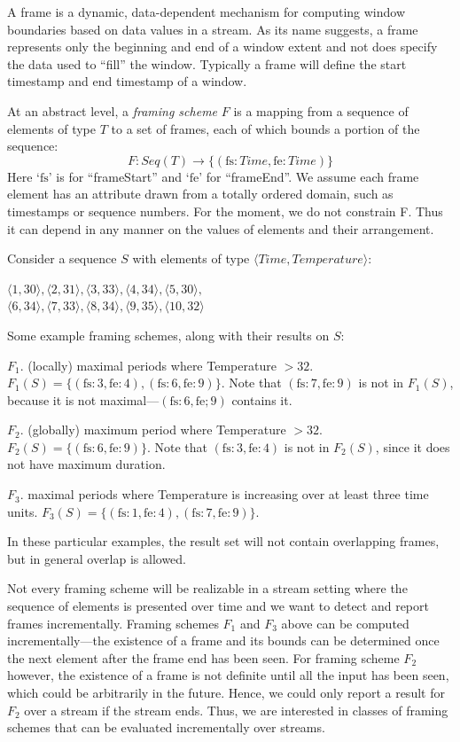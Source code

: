 \documentclass{vldb}
\newcommand{\dquote}[1]{``#1''}
\newcommand{\squote}[1]{`#1'}
\begin{document}
\begin{appendix}
A frame is a dynamic, data-dependent mechanism for computing window boundaries based on data values in a stream. As its name suggests, a frame represents only the beginning and end of a window extent and not does specify the data used to \dquote{fill} the window. Typically a frame will define the start timestamp and end timestamp of a window.

At an abstract level, a \emph{framing scheme} $F$ is a mapping from a sequence of elements of type $T$ to a set of frames, each of which bounds a portion of the sequence: $$F: Seq(T) \rightarrow \{(\text{fs}: Time, \text{fe}: Time)\}$$ Here \squote{$\text{fs}$} is for \dquote{frameStart} and \squote{$\text{fe}$} for \dquote{frameEnd}. We assume each frame element has an attribute drawn from a totally ordered domain, such as timestamps or sequence numbers. For the moment, we do not constrain F. Thus it can depend in any manner on the values of elements and their arrangement.

Consider a sequence $S$ with elements of type $\langle Time, Temperature \rangle$: 
\begin{center}
$\langle 1, 30 \rangle, \langle 2, 31 \rangle, \langle 3, 33 \rangle, \langle 4,34 \rangle, \langle 5, 30 \rangle,$ \\ 
$ \langle 6, 34 \rangle, \langle 7, 33 \rangle, \langle 8, 34 \rangle, \langle 9, 35 \rangle, \langle 10, 32 \rangle$
\end{center}
Some example framing schemes, along with their results on $S$:

$F_1$. (locally) maximal periods where Temperature $> 32$.  $F_1(S) = \{(\text{fs}: 3, \text{fe}: 4), (\text{fs}: 6, \text{fe}: 9)\}$. Note that $(\text{fs}: 7, \text{fe}: 9)$ is not in $F_1(S)$, because it is not maximal---$(\text{fs}: 6, \text{fe}; 9)$ contains it.

$F_2$. (globally) maximum period where Temperature $> 32$. $F_2(S) = \{(\text{fs}: 6, \text{fe}: 9)\}$. Note that $(\text{fs}: 3, \text{fe}: 4)$ is not in $F_2(S)$, since it does not have maximum duration.

$F_3$. maximal periods where Temperature is increasing over at least three time units. $F_3(S) = \{(\text{fs}: 1, \text{fe}: 4), (\text{fs}: 7, \text{fe}: 9)\}$.

In these particular examples, the result set will not contain overlapping frames, but in general overlap is allowed.

Not every framing scheme will be realizable in a stream setting where the sequence of elements is presented over time and we want to detect and report frames incrementally. Framing schemes $F_1$ and $F_3$ above can be computed incrementally---the existence of a frame and its bounds can be determined once the next element after the frame end has been seen. For framing scheme $F_2$ however, the existence of a frame is not definite until all the input has been seen, which could be arbitrarily in the future. Hence, we could only report a result for $F_2$ over a stream if the stream ends. Thus, we are interested in classes of framing schemes that can be evaluated incrementally over streams.


\end{appendix}
\end{document}
